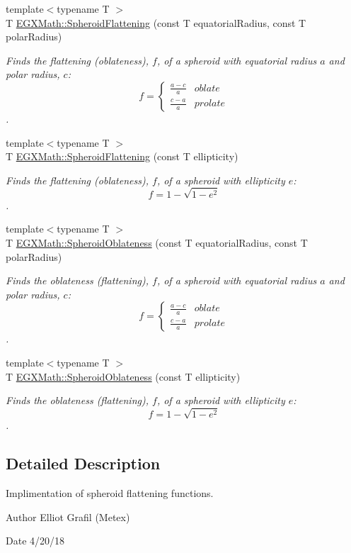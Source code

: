 \begin{DoxyCompactItemize}
\item 
{\footnotesize template$<$typename T $>$ }\\T \mbox{\hyperlink{group___e_g_x_math-_geometry-3_d-_spheroid-_flattening_ga640f4bcd86aa4c378819bffda31c0852}{E\+G\+X\+Math\+::\+Spheroid\+Flattening}} (const T equatorial\+Radius, const T polar\+Radius)
\begin{DoxyCompactList}\small\item\em Finds the flattening (oblateness), $f$, of a spheroid with equatorial radius $a$ and polar radius, $c$\+: \[ f =\begin{cases} \frac{a-c}{a}{} & oblate \\ \frac{c-a}{a} & prolate \end{cases} \]. \end{DoxyCompactList}\item 
{\footnotesize template$<$typename T $>$ }\\T \mbox{\hyperlink{group___e_g_x_math-_geometry-3_d-_spheroid-_flattening_gacd0d1ae60af3a7f1a09ed2f65636c132}{E\+G\+X\+Math\+::\+Spheroid\+Flattening}} (const T ellipticity)
\begin{DoxyCompactList}\small\item\em Finds the flattening (oblateness), $f$, of a spheroid with ellipticity $e$\+: \[ f = 1 - \sqrt{1-e^2} \]. \end{DoxyCompactList}\item 
{\footnotesize template$<$typename T $>$ }\\T \mbox{\hyperlink{group___e_g_x_math-_geometry-3_d-_spheroid-_flattening_ga8f547f5dd10721862b602c7769eb6116}{E\+G\+X\+Math\+::\+Spheroid\+Oblateness}} (const T equatorial\+Radius, const T polar\+Radius)
\begin{DoxyCompactList}\small\item\em Finds the oblateness (flattening), $f$, of a spheroid with equatorial radius $a$ and polar radius, $c$\+: \[ f =\begin{cases} \frac{a-c}{a}{} & oblate \\ \frac{c-a}{a} & prolate \end{cases} \]. \end{DoxyCompactList}\item 
{\footnotesize template$<$typename T $>$ }\\T \mbox{\hyperlink{group___e_g_x_math-_geometry-3_d-_spheroid-_flattening_gaf2530de595124e75a7f58482d617cfce}{E\+G\+X\+Math\+::\+Spheroid\+Oblateness}} (const T ellipticity)
\begin{DoxyCompactList}\small\item\em Finds the oblateness (flattening), $f$, of a spheroid with ellipticity $e$\+: \[ f = 1 - \sqrt{1-e^2} \]. \end{DoxyCompactList}\end{DoxyCompactItemize}


\subsection{Detailed Description}
Implimentation of spheroid flattening functions. 

\begin{DoxyAuthor}{Author}
Elliot Grafil (Metex) 
\end{DoxyAuthor}
\begin{DoxyDate}{Date}
4/20/18 
\end{DoxyDate}

